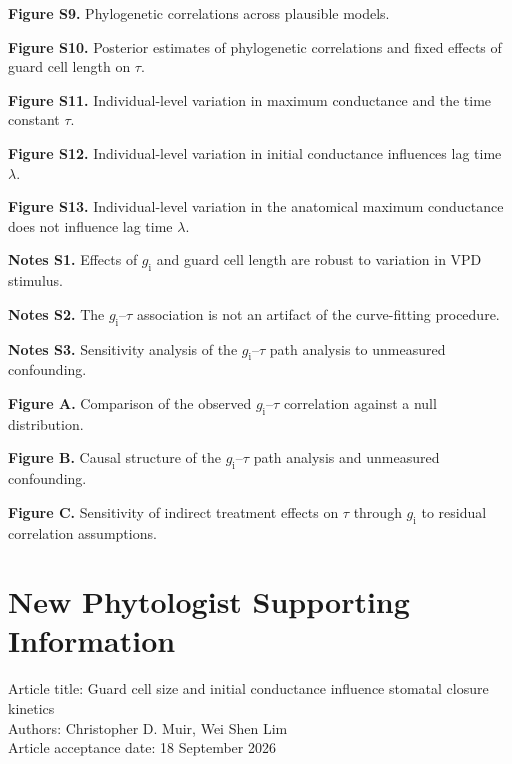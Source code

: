 \documentclass[
  letterpaper,
  DIV=11,
  numbers=noendperiod]{scrartcl}
\begin{document}
\begin{flushleft}
\textbf{Figure S9.} Phylogenetic correlations across plausible models.

\textbf{Figure S10.} Posterior estimates of phylogenetic correlations
and fixed effects of guard cell length on \(\tau\).

\textbf{Figure S11.} Individual-level variation in maximum conductance
and the time constant \(\tau\).

\textbf{Figure S12.} Individual-level variation in initial conductance
influences lag time \(\lambda\).

\textbf{Figure S13.} Individual-level variation in the anatomical
maximum conductance does not influence lag time \(\lambda\).

\textbf{Notes S1.} Effects of \(g_\mathrm{i}\) and guard cell length are
robust to variation in VPD stimulus.

\textbf{Notes S2.} The \(g_\mathrm{i}\)--\(\tau\) association is not an
artifact of the curve-fitting procedure.

\textbf{Notes S3.} Sensitivity analysis of the
\(g_\mathrm{i}\)--\(\tau\) path analysis to unmeasured confounding.

\textbf{Figure A.} Comparison of the observed \(g_\mathrm{i}\)--\(\tau\)
correlation against a null distribution.

\textbf{Figure B.} Causal structure of the \(g_\mathrm{i}\)--\(\tau\)
path analysis and unmeasured confounding.

\textbf{Figure C.} Sensitivity of indirect treatment effects on \(\tau\)
through \(g_\mathrm{i}\) to residual correlation assumptions.

\end{flushleft}

\newpage{}

\section{New Phytologist Supporting
Information}\label{new-phytologist-supporting-information}

Article title: Guard cell size and initial conductance influence stomatal closure kinetics\\
Authors: Christopher D. Muir, Wei Shen Lim\\
Article acceptance date: 18 September 2026

\renewcommand{\thefigure}{S\arabic{figure}}
\renewcommand{\thetable}{S\arabic{table}}
\renewcommand{\theequation}{S\arabic{equation}}
\setcounter{figure}{0}
\setcounter{table}{0}
\setcounter{equation}{0}
\setcounter{page}{1}
\FloatBarrier
\end{document}
